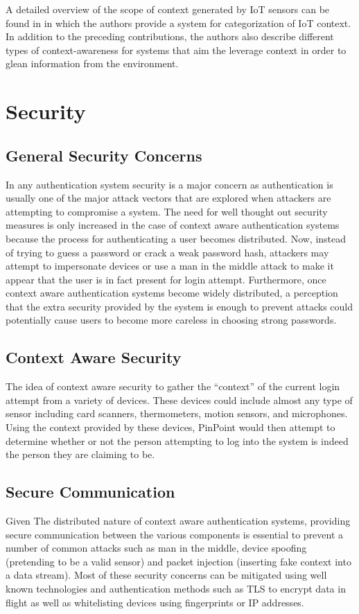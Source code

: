 \documentclass[11pt,journal]{IEEEtran}
\begin{document}
A detailed overview of the scope of context generated by IoT sensors can be found in \citet{Habib:2015} in which the authors provide a system for categorization of IoT context.  In addition to the preceding contributions, the authors also describe different types of context-awareness for systems that aim the leverage context in order to glean information from the environment.

\section{Security}

\subsection{General Security Concerns}
In any authentication system security is a major concern as authentication is usually one of the major attack vectors that are explored when attackers are attempting to compromise a system.  The need for well thought out security measures is only increased in the case of context aware authentication systems because the process for authenticating a user becomes distributed.  Now, instead of trying to guess a password or crack a weak password hash, attackers may attempt to impersonate devices or use a man in the middle attack to make it appear that the user is in fact present for login attempt.  Furthermore, once context aware authentication systems become widely distributed, a perception that the extra security provided by the system is enough to prevent attacks could potentially cause users to become more careless in choosing strong passwords.

\subsection{Context Aware Security}
The idea of context aware security to gather the “context” of the current login attempt from a variety of devices.  These devices could include almost any type of sensor including card scanners, thermometers, motion sensors, and microphones.  Using the context provided by these devices, PinPoint would then attempt to determine whether or not the person attempting to log into the system is indeed the person they are claiming to be.

\subsection{Secure Communication}
Given The distributed nature of context aware authentication systems, providing secure communication between the various components is essential to prevent a number of common attacks such as man in the middle, device spoofing (pretending to be a valid sensor) and packet injection (inserting fake context into a data stream).  Most of these security concerns can be mitigated using well known technologies and authentication methods such as TLS to encrypt data in flight as well as whitelisting devices using fingerprints or IP addresses.
\end{document}
